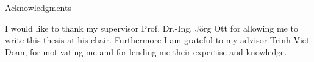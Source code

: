 \thispagestyle{empty}

\vspace*{20mm}

\begin{center}
{ Acknowledgments}
\end{center}

\vspace{10mm}

I would like to thank my supervisor Prof. Dr.-Ing. Jörg Ott for allowing me to write this thesis at his chair. Furthermore I am grateful to my advisor Trinh Viet Doan, for motivating me and for lending me their expertise and knowledge.

\vspace{10mm}


\cleardoublepage{}
